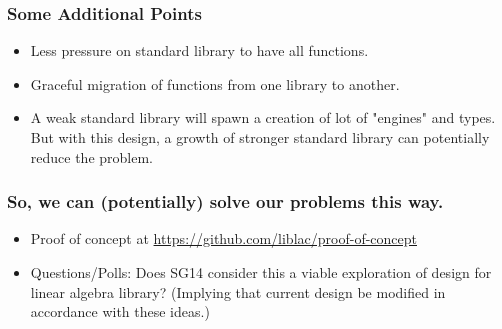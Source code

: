 \documentclass[dvipsnames,10pt]{jbeamer}
\begin{document}
\begin{frame}
  \frametitle{Some Additional Points}

  \begin{itemize}
    \item Less pressure on standard library to have all functions.
    \item Graceful migration of functions from one library to another.
    \item A weak standard library will spawn a creation of lot of "engines" and
      types. But with this design, a growth of  stronger standard library can
      potentially reduce the problem.
  \end{itemize}
\end{frame}



\begin{frame}
  \frametitle{So, we can (potentially) solve our problems this way.}

  \begin{itemize}
    \item Proof of concept at
      \url{https://github.com/liblac/proof-of-concept}

    \item Questions/Polls: Does SG14 consider this a viable exploration of
      design for linear algebra library?
      (Implying that current design be modified in accordance with these ideas.)
  \end{itemize}
\end{frame}
\end{document}
